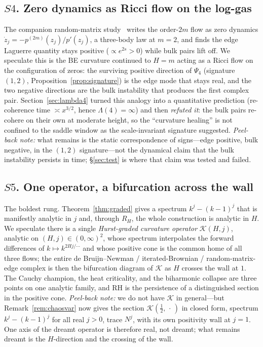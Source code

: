 \documentclass[11pt,reqno]{amsart}
\theoremstyle{plain}
\theoremstyle{definition}
\theoremstyle{remark}
\begin{document}
\subsection*{$S4$. Zero dynamics as Ricci flow on the log-gas}
The companion random-matrix study~\cite{FontesRMT} writes the
order-$2m$ flow as zero dynamics $\dot z_j=-p^{(2m)}(z_j)/p'(z_j)$, a
three-body law at $m=2$, and finds the edge Laguerre quantity stays
positive ($\propto e^{2s}>0$) while bulk pairs lift off. We speculate
this is the BE curvature continued to $H=m$ acting as a Ricci flow on
the configuration of zeros: the surviving positive direction of
$\Psi_4$ (signature $(1,2)$, Proposition~\ref{prop:signature}) is the
edge mode that stays real, and the two negative directions are the bulk
instability that produces the first complex pair. Section~\ref{sec:lambda4}
turned this analogy into a quantitative prediction (re-coherence time
$\asymp x^{3/2}$, hence $\Lambda(4)=\infty$) and then \emph{refuted it}:
the bulk pairs re-cohere on their own at moderate height, so the
``curvature healing'' is not confined to the saddle window as the
scale-invariant signature suggested. \emph{Peel-back note:} what remains
is the static correspondence of signs---edge positive, bulk negative,
in the $(1,2)$ signature---not the dynamical claim that the bulk
instability persists in time; \S\ref{sec:test} is where that claim was
tested and failed.

\subsection*{$S5$. One operator, a bifurcation across the wall}
The boldest rung. Theorem~\ref{thm:graded} gives a spectrum
$k^j-(k-1)^j$ that is manifestly analytic in $j$ and, through
$R_H$, the whole construction is analytic in $H$. We speculate there is
a single \emph{Hurst-graded curvature operator} $\mathcal K(H,j)$,
analytic on $(H,j)\in(0,\infty)^2$, whose spectrum interpolates the
forward differences of $k\mapsto k^{2Hj/\cdots}$ and whose positive
cone is the common home of all three flows; the entire de
Bruijn--Newman / iterated-Brownian / random-matrix-edge complex is then
the bifurcation diagram of $\mathcal K$ as $H$ crosses the wall at $1$.
The Cauchy champion, the heat criticality, and the biharmonic collapse
are three points on one analytic family, and RH is the persistence of a
distinguished section in the positive cone. \emph{Peel-back note:} we do
not have $\mathcal K$ in general---but Remark~\ref{rem:chaosvar} now
gives the section $\mathcal K(\tfrac12,\,\cdot\,)$ in closed form,
spectrum $k^j-(k-1)^j$ for all real $j>0$, trace $N^j$, with its own
positivity wall at $j=1$. One axis of the dreamt operator is therefore
real, not dreamt; what remains dreamt is the $H$-direction and the
crossing of the wall.
\end{document}
